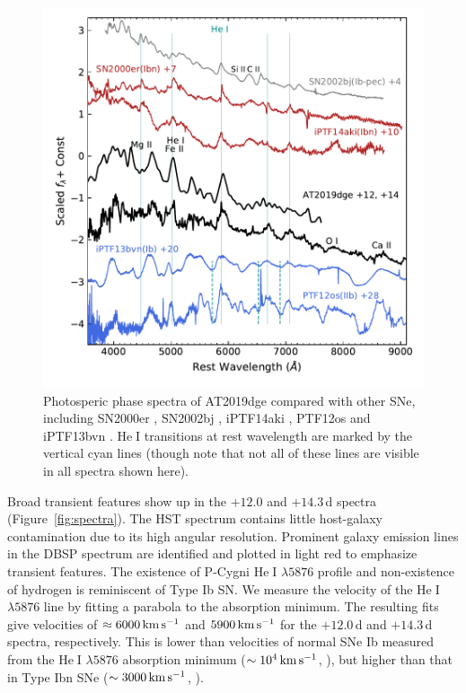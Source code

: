 \documentclass[twocolumn]{aastex63}
\def\ion#1#2{#1$\;${\footnotesize\rm{#2}}\relax}
\begin{document}
\begin{CJK*}{UTF8}{gbsn}
\begin{figure}[htbp!]
	\centering
	\includegraphics[width=\columnwidth]{figures/hst_opt.pdf}
	\caption{Photosperic phase spectra of AT2019dge compared with 
		other SNe, including SN2000er \citep{Pastorello2008}, SN2002bj \citep{Poznanski2010}, iPTF14aki 
		\citep{Hosseinzadeh2017}, PTF12os and iPTF13bvn \citep{Fremling2016}. \ion{He}{I} transitions at 
		rest wavelength are marked by the vertical cyan lines (though note that not all of these lines are 
		visible in all spectra shown here).
		\label{fig:hst_opt}}
\end{figure}

Broad transient features show up in the $+12.0$ and $+14.3$\,d spectra (Figure~\ref{fig:spectra}). The 
HST spectrum contains little host-galaxy contamination 
due to its high angular resolution. Prominent galaxy emission lines in the DBSP 
spectrum are identified and plotted in light red to emphasize transient features. The existence of 
P-Cygni \ion{He}{I} $\lambda5876$ profile and non-existence of hydrogen is reminiscent of Type Ib SN. 
We measure the velocity of the \ion{He}{I} $\lambda5876$ line by fitting a parabola to the absorption 
minimum. The resulting fits give velocities of $\approx 6000\, {\rm km\,s^{-1}}$ and $ 5900\, {\rm 
km\,s^{-1}}$ for the $+12.0$\,d and $+14.3$\,d spectra, respectively. This is lower than velocities of 
normal SNe Ib measured from the \ion{He}{I} $\lambda5876$ absorption minimum ($\sim 10^4\, \rm km\, 
s^{-1}$, \citealt{Liu2016}), but higher than that in Type Ibn SNe ($\sim 3000\, \rm km\, s^{-1}$, 
\citealt{Hosseinzadeh2017}).


\end{CJK*}
\end{document}
